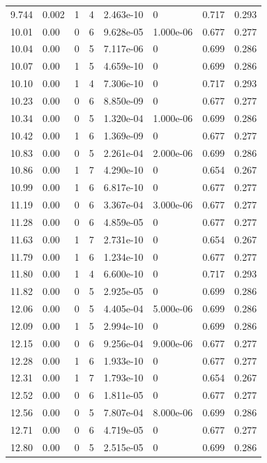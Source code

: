 \documentclass[preview]{standalone}
\begin{document}
{{{\begin{tabular}{L{1.2cm}C{1.2cm} C{0.3cm}C{0.5cm} C{1.4cm}C{1.4cm} C{1.4cm}C{1.4cm}}
  9.744  &  0.002  & 1     &  4 &  2.463e-10  & 0  & 0.717 &  0.293   \\ 
  10.01  &  0.00  & 0     &  6 &  9.628e-05  & 1.000e-06  & 0.677 &  0.277   \\ 
  10.04  &  0.00  & 0     &  5 &  7.117e-06  & 0  & 0.699 &  0.286   \\ 
  10.07  &  0.00  & 1     &  5 &  4.659e-10  & 0  & 0.699 &  0.286   \\ 
  10.10  &  0.00  & 1     &  4 &  7.306e-10  & 0  & 0.717 &  0.293   \\ 
  10.23  &  0.00  & 0     &  6 &  8.850e-09  & 0  & 0.677 &  0.277   \\ 
  10.34  &  0.00  & 0     &  5 &  1.320e-04  & 1.000e-06  & 0.699 &  0.286   \\ 
  10.42  &  0.00  & 1     &  6 &  1.369e-09  & 0  & 0.677 &  0.277   \\ 
  10.83  &  0.00  & 0     &  5 &  2.261e-04  & 2.000e-06  & 0.699 &  0.286   \\ 
  10.86  &  0.00  & 1     &  7 &  4.290e-10  & 0  & 0.654 &  0.267   \\ 
  10.99  &  0.00  & 1     &  6 &  6.817e-10  & 0  & 0.677 &  0.277   \\ 
  11.19  &  0.00  & 0     &  6 &  3.367e-04  & 3.000e-06  & 0.677 &  0.277   \\ 
  11.28  &  0.00  & 0     &  6 &  4.859e-05  & 0  & 0.677 &  0.277   \\ 
  11.63  &  0.00  & 1     &  7 &  2.731e-10  & 0  & 0.654 &  0.267   \\ 
  11.79  &  0.00  & 1     &  6 &  1.234e-10  & 0  & 0.677 &  0.277   \\ 
  11.80  &  0.00  & 1     &  4 &  6.600e-10  & 0  & 0.717 &  0.293   \\ 
  11.82  &  0.00  & 0     &  5 &  2.925e-05  & 0  & 0.699 &  0.286   \\ 
  12.06  &  0.00  & 0     &  5 &  4.405e-04  & 5.000e-06  & 0.699 &  0.286   \\ 
  12.09  &  0.00  & 1     &  5 &  2.994e-10  & 0  & 0.699 &  0.286   \\ 
  12.15  &  0.00  & 0     &  6 &  9.256e-04  & 9.000e-06  & 0.677 &  0.277   \\ 
  12.28  &  0.00  & 1     &  6 &  1.933e-10  & 0  & 0.677 &  0.277   \\ 
  12.31  &  0.00  & 1     &  7 &  1.793e-10  & 0  & 0.654 &  0.267   \\ 
  12.52  &  0.00  & 0     &  6 &  1.811e-05  & 0  & 0.677 &  0.277   \\ 
  12.56  &  0.00  & 0     &  5 &  7.807e-04  & 8.000e-06  & 0.699 &  0.286   \\ 
  12.71  &  0.00  & 0     &  6 &  4.719e-05  & 0  & 0.677 &  0.277   \\ 
  12.80  &  0.00  & 0     &  5 &  2.515e-05  & 0  & 0.699 &  0.286   \\ 
\hline 
\end{tabular} 

}}}
\end{document}
